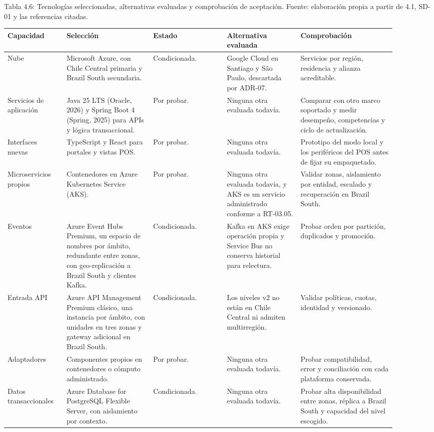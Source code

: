 \documentclass[11pt]{article}
\begin{document}
Tabla 4.6: Tecnologías seleccionadas, alternativas evaluadas y comprobación de aceptación. Fuente: elaboración propia a partir de 4.1, SD-01 y las referencias citadas.\par\nopagebreak
\begin{longtable}{@{}p{0.135\linewidth}p{0.2\linewidth}p{0.17\linewidth}p{0.17\linewidth}p{0.225\linewidth}@{}}
\toprule Capacidad & Selección & Estado & Alternativa evaluada & Comprobación \\
\midrule\endhead\bottomrule\endlastfoot
Nube & Microsoft Azure, con Chile Central primaria y Brazil South secundaria. & Condicionada. & Google Cloud en Santiago y São Paulo, descartada por ADR-07. & Servicios por región, residencia y alianza acreditable. \\
Servicios de aplicación & Java 25 LTS (Oracle, 2026) y Spring Boot 4 (Spring, 2025) para APIs y lógica transaccional. & Por probar. & Ninguna otra evaluada todavía. & Comparar con otro marco soportado y medir desempeño, competencias y ciclo de actualización. \\
Interfaces nuevas & TypeScript y React para portales y vistas POS. & Por probar. & Ninguna otra evaluada todavía. & Prototipo del modo local y los periféricos del POS antes de fijar su empaquetado. \\
Microservicios propios & Contenedores en Azure Kubernetes Service (AKS). & Por probar. & Ninguna otra evaluada todavía, y AKS es un servicio administrado conforme a RT-03.05. & Validar zonas, aislamiento por entidad, escalado y recuperación en Brazil South. \\
Eventos & Azure Event Hubs Premium, un espacio de nombres por ámbito, redundante entre zonas, con geo-replicación a Brazil South y clientes Kafka. & Condicionada. & Kafka en AKS exige operación propia y Service Bus no conserva historial para relectura. & Probar orden por partición, duplicados y promoción. \\
Entrada API & Azure API Management Premium clásico, una instancia por ámbito, con unidades en tres zonas y gateway adicional en Brazil South. & Condicionada. & Los niveles v2 no están en Chile Central ni admiten multirregión. & Validar políticas, cuotas, identidad y versionado. \\
Adaptadores & Componentes propios en contenedores o cómputo administrado. & Por probar. & Ninguna otra evaluada todavía. & Probar compatibilidad, error y conciliación con cada plataforma conservada. \\
Datos transaccionales & Azure Database for PostgreSQL Flexible Server, con aislamiento por contexto. & Condicionada. & Ninguna otra evaluada todavía. & Probar alta disponibilidad entre zonas, réplica a Brazil South y capacidad del nivel escogido. \\

\end{longtable}
\end{document}
